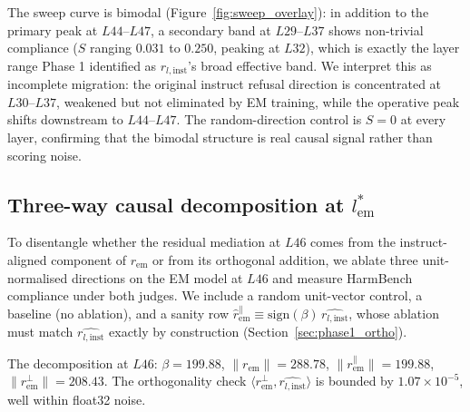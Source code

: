 \documentclass{article}
\newcommand{\rinst}{r_{l,\mathrm{inst}}}
\newcommand{\rem}{r_{\mathrm{em}}}
\begin{document}
The sweep curve is bimodal (Figure~\ref{fig:sweep_overlay}): in
addition to the primary peak at $L44$--$L47$, a secondary band at
$L29$--$L37$ shows non-trivial compliance ($S$ ranging $0.031$ to
$0.250$, peaking at $L32$), which is exactly the layer range Phase 1
identified as $\rinst$'s broad effective band. We interpret this as incomplete migration: the original instruct refusal direction is concentrated at $L30$–$L37$, weakened but not eliminated by EM training, while the operative peak shifts downstream to $L44$–$L47$. The
random-direction control is $S=0$ at every layer, confirming that
the bimodal structure is real causal signal rather than scoring
noise.

\subsection{Three-way causal decomposition at $l^{*}_{\mathrm{em}}$}
\label{sec:phase2_threeway}

To disentangle whether the residual mediation at $L46$ comes from
the instruct-aligned component of $\rem$ or from its orthogonal
addition, we ablate three unit-normalised directions on the EM
model at $L46$ and measure HarmBench compliance under both judges.
We include a random unit-vector control, a baseline (no ablation),
and a sanity row $\hat{r}^{\parallel}_{\mathrm{em}} \equiv
\mathrm{sign}(\beta)\,\hat{\rinst}$, whose ablation must match
$\hat{\rinst}$ exactly by construction
(Section~\ref{sec:phase1_ortho}).

The decomposition at $L46$: $\beta=199.88$, $\|\rem\|=288.78$,
$\|r^{\parallel}_{\mathrm{em}}\|=199.88$,
$\|r^{\perp}_{\mathrm{em}}\|=208.43$. The orthogonality check
$\langle r^{\perp}_{\mathrm{em}}, \hat{\rinst} \rangle$ is bounded
by $1.07 \times 10^{-5}$, well within float32 noise.
\end{document}
